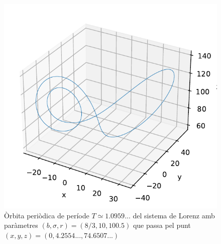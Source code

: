 \documentclass[a4paper]{article}
\theoremstyle{definition}
\begin{document}
\begin{figure}[ht]
  \centering
  \includegraphics[width=0.4\linewidth]{Images/op3-100.5.pdf}
  \caption{Òrbita periòdica de període $T\simeq 1.0959...$ del sistema de Lorenz amb paràmetres $(b, \sigma, r) = (8/3, 10 , 100.5)$ que passa pel punt  $(x,y,z)=(0,4.2554..., 74.6507...)$}
  \label{op3-0}
\end{figure}
\end{document}
